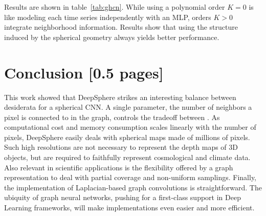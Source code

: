 \documentclass{article} %
\newcommand{\todo}[1]{{\color[rgb]{.6,.1,.6}{#1}}}
\newcommand{\tabref}[1]{table~\ref{tab:#1}}
\begin{document}
Results are shown in \tabref{ghcn}.
While using a polynomial order $K=0$ is like modeling each time series independently with an MLP, orders $K>0$ integrate neighborhood information.
Results show that using the structure induced by the spherical geometry always yields better performance.


\section{Conclusion [0.5 pages]}

This work showed that DeepSphere strikes an interesting balance between desiderata for a spherical CNN.
A single parameter, the number of neighbors a pixel is connected to in the graph, controls the tradeoff between \todo{performance and efficiency}.
As computational cost and memory consumption scales linearly with the number of pixels, DeepSphere easily deals with spherical maps made of millions of pixels.
Such high resolutions are not necessary to represent the depth maps of 3D objects, but are required to faithfully represent cosmological and climate data.
Also relevant in scientific applications is the flexibility offered by a graph representation to deal with partial coverage and non-uniform samplings.
Finally, the implementation of Laplacian-based graph convolutions is straightforward.
The ubiquity of graph neural networks, pushing for a first-class support in Deep Learning frameworks, will make implementations even easier and more efficient.
\end{document}
